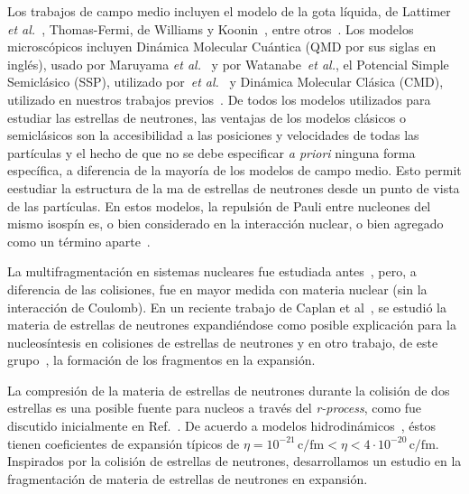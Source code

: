 Los trabajos de campo medio incluyen el modelo de la gota líquida, de Lattimer \emph{et al.}~\cite{page_minimal_2004}, Thomas-Fermi, de Williams y Koonin~\cite{williams_sub-saturation_1985}, entre otros~\cite{oyamatsu_nuclear_1993, lorenz_neutron_1993, cheng_properties_1997, watanabe_thermodynamic_2000, watanabe_electron_2003, nakazato_gyroid_2009}.
Los modelos microscópicos incluyen Dinámica Molecular Cuántica (QMD por sus siglas en inglés), usado por Maruyama \emph{et al.}~\cite{maruyama_quantum_1998, kido_md_2000} y por Watanabe~\emph{et al.}\cite{watanabe_structure_2003}, el Potencial Simple Semiclásico (SSP), utilizado por~\emph{et al.}~\cite{horowitz_nonuniform_2004} y Dinámica Molecular Clásica (CMD), utilizado en nuestros trabajos previos~\cite{dorso_topological_2012}.
De todos los modelos utilizados para estudiar las estrellas de neutrones, las ventajas de los modelos clásicos o semiclásicos son la accesibilidad a las posiciones y velocidades de todas las partículas y el hecho de que no se debe especificar \emph{a priori} ninguna forma específica, a diferencia de la mayoría de los modelos de campo medio.
Esto permit eestudiar la estructura de la ma de estrellas de neutrones desde un punto de vista de las partículas.
En estos modelos, la repulsión de Pauli entre nucleones del mismo isospín es, o bien considerado en la interacción nuclear, o bien agregado como un término aparte~\cite{dorso_classical_1988}.

La multifragmentación en sistemas nucleares fue estudiada
antes~\cite{bonasera_critical_2000, chikazumi_quantum_2001}, pero, a
diferencia de las colisiones, fue en mayor medida con materia nuclear (sin la interacción de Coulomb).
En un reciente trabajo de Caplan et al~\cite{caplan_pasta_2015}, se estudió la materia de estrellas de neutrones expandiéndose como posible explicación para la nucleosíntesis en colisiones de estrellas de neutrones y en otro trabajo, de este grupo~\cite{alcain_dynamics_2017}, la formación de los fragmentos en la expansión.

La compresión de la materia de estrellas de neutrones durante la colisión de dos estrellas es una posible fuente para nucleos a través del \emph{r-process}, como fue discutido inicialmente en Ref.~\cite{lattimer_black-hole-neutron-star_1974}.
De acuerdo a modelos hidrodinámicos~\cite{goriely_r-process_2011}, éstos tienen coeficientes de expansión típicos de  $\eta = 10^{-21}\,\text{c/fm} < \eta < 4\cdot 10^{-20}\,\text{c/fm}$.
Inspirados por la colisión de estrellas de neutrones, desarrollamos un estudio en la fragmentación de materia de estrellas de neutrones en expansión.

